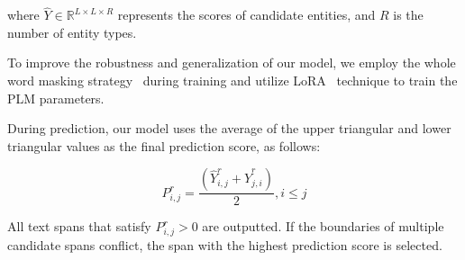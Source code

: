 \noindent where $\widehat{Y}\in \mathbb{R}^{L\times L\times R}$ represents the scores of candidate entities, and $R$ is the number of entity types.

To improve the robustness and generalization of our model,
we employ the whole word masking strategy~\cite{cui2021pre} during training and utilize LoRA~\cite{hu2021lora} technique to train the PLM parameters.

During prediction, our model uses the average of the upper triangular and lower triangular values as the final prediction score, as follows:

\begin{equation}
P_{i,j}^{r}= \frac{\left ( \widehat{Y}_{i,j}^{r}+\widehat{Y}_{j,i}^{r} \right )}{2}, i\leq j\label{eq8}
\end{equation}

All text spans that satisfy $P_{i,j}^{r}>0$ 
are outputted. 
If the boundaries of multiple candidate spans conflict, the span with the highest prediction score is selected.